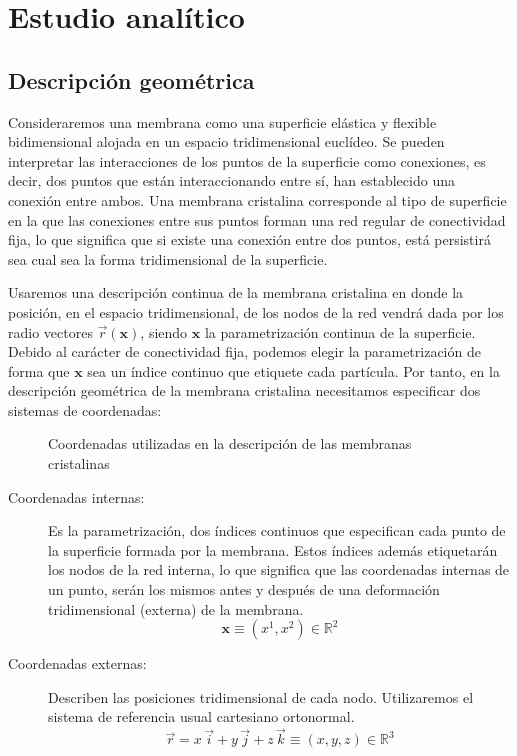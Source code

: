 \chapter{Estudio analítico}

\section{Descripción geométrica}

Consideraremos una membrana como una superficie elástica y flexible 
bidimensional alojada en un espacio tridimensional euclídeo. 
Se pueden interpretar las interacciones de los puntos de la superficie como
conexiones, es decir, dos puntos que están interaccionando entre sí, han
establecido una conexión entre ambos. Una membrana cristalina corresponde al
tipo de superficie en la que las conexiones entre sus puntos forman una red
regular de conectividad fija, lo que significa que si existe una conexión
entre dos puntos, está persistirá sea cual sea la forma tridimensional de la
superficie.

Usaremos una descripción continua de la membrana cristalina \cite{David:geometria} en donde la
posición, en el espacio tridimensional, de los nodos de la red vendrá dada por los
radio vectores $\vec{r}(\mathbf{x})$, siendo $\mathbf{x}$ la parametrización
continua de la superficie. Debido al carácter de conectividad fija, podemos
elegir la parametrización de forma que $\mathbf{x}$ sea un índice continuo
que etiquete cada partícula. Por tanto, en la descripción geométrica de la
membrana cristalina necesitamos especificar dos sistemas de coordenadas:

\begin{figure}[h]
\centering
{}
\quad
{}
\caption{Coordenadas utilizadas en la descripción de las membranas cristalinas}
\end{figure}

\begin{description}
\item[Coordenadas internas:] Es la parametrización, dos índices continuos que
  especifican cada punto de la superficie formada por la membrana. Estos
  índices además etiquetarán los nodos de la red interna, lo que significa que las
  coordenadas internas de un punto, serán los mismos antes y después de una
  deformación tridimensional (externa) de la membrana. 
  \begin{equation*}
  \mathbf{x}\equiv (x^1,x^2)\in \mathbb{R}^2
  \end{equation*}
\item[Coordenadas externas:] Describen las posiciones tridimensional de cada
  nodo. Utilizaremos el sistema de referencia usual cartesiano ortonormal.
  \begin{equation*}
    \vec{r}=x\,\vec{i}+y\,\vec{j}+z\,\vec{k}\equiv (x,y,z)\in \mathbb{R}^3
  \end{equation*}
\end{description}

